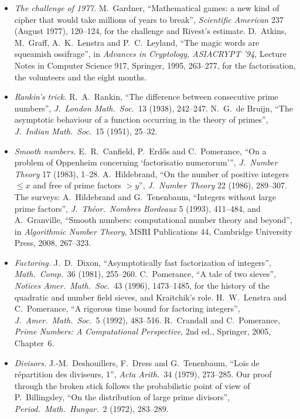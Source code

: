 \begin{itemize}
\item \emph{The challenge of 1977.} M.~Gardner, ``Mathematical games: a new kind of cipher that would take millions of years to break'', \emph{Scientific American} 237 (August 1977), 120--124, for the challenge and Rivest's estimate. D.~Atkins, M.~Graff, A.~K.~Lenstra and P.~C.~Leyland, ``The magic words are squeamish ossifrage'', in \emph{Advances in Cryptology, ASIACRYPT '94}, Lecture Notes in Computer Science 917, Springer, 1995, 263--277, for the factorisation, the volunteers and the eight months.
\item \emph{Rankin's trick.} R.~A.~Rankin, ``The difference between consecutive prime numbers'', \emph{J.\ London Math.\ Soc.}\ 13 (1938), 242--247. N.~G.~de Bruijn, ``The asymptotic behaviour of a function occurring in the theory of primes'', \emph{J.\ Indian Math.\ Soc.}\ 15 (1951), 25--32.
\item \emph{Smooth numbers.} E.~R.~Canfield, P.~Erd\H{o}s and C.~Pomerance, ``On a problem of Oppenheim concerning `factorisatio numerorum''', \emph{J.\ Number Theory} 17 (1983), 1--28. A.~Hildebrand, ``On the number of positive integers $\le x$ and free of prime factors $>y$'', \emph{J.\ Number Theory} 22 (1986), 289--307. The surveys: A.~Hildebrand and G.~Tenenbaum, ``Integers without large prime factors'', \emph{J.\ Théor.\ Nombres Bordeaux} 5 (1993), 411--484, and A.~Granville, ``Smooth numbers: computational number theory and beyond'', in \emph{Algorithmic Number Theory}, MSRI Publications 44, Cambridge University Press, 2008, 267--323.
\item \emph{Factoring.} J.~D.~Dixon, ``Asymptotically fast factorization of integers'', \emph{Math.\ Comp.}\ 36 (1981), 255--260. C.~Pomerance, ``A tale of two sieves'', \emph{Notices Amer.\ Math.\ Soc.}\ 43 (1996), 1473--1485, for the history of the quadratic and number field sieves, and Kraitchik's role. H.~W.~Lenstra and C.~Pomerance, ``A rigorous time bound for factoring integers'', \emph{J.\ Amer.\ Math.\ Soc.}\ 5 (1992), 483--516. R.~Crandall and C.~Pomerance, \emph{Prime Numbers: A Computational Perspective}, 2nd ed., Springer, 2005, Chapter~6.
\item \emph{Divisors.} J.-M.~Deshouillers, F.~Dress and G.~Tenenbaum, ``Lois de répartition des diviseurs, 1'', \emph{Acta Arith.}\ 34 (1979), 273--285. Our proof through the broken stick follows the probabilistic point of view of P.~Billingsley, ``On the distribution of large prime divisors'', \emph{Period.\ Math.\ Hungar.}\ 2 (1972), 283--289.

\end{itemize}
